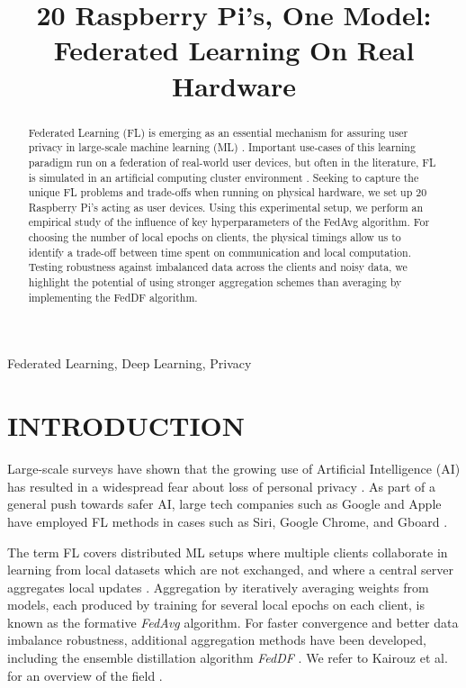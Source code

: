 \documentclass{article}
\title{20 Raspberry Pi's, One Model: Federated Learning On Real Hardware}
\begin{document}
%

\maketitle
%
\begin{abstract}
    Federated Learning (FL) is emerging as an essential mechanism for assuring user privacy in large-scale machine learning (ML) \cite{kai2021advances}.
    Important use-cases of this learning paradigm run on a federation of real-world user devices, but often in the literature, FL is simulated in an artificial computing cluster environment \cite{kai2021advances,mcmahan2017communication,lin2020ensemble}.
    Seeking to capture the unique FL problems and trade-offs when running on physical hardware, we set up 20 Raspberry Pi's acting as user devices.
    Using this experimental setup, we perform an empirical study of the influence of key hyperparameters of the FedAvg \cite{mcmahan2017communication} algorithm.
    For choosing the number of local epochs on clients, the physical timings allow us to identify a trade-off between time spent on communication and local computation.
    Testing robustness against imbalanced data across the clients and noisy data, we highlight the potential of using stronger aggregation schemes than averaging by implementing the FedDF \cite{lin2020ensemble} algorithm.
\end{abstract}
%
\begin{keywords}
    Federated Learning, Deep Learning, Privacy
\end{keywords}


\section{INTRODUCTION}
\label{sec:intro}
Large-scale surveys have shown that the growing use of Artificial Intelligence (AI) has resulted in a widespread fear about loss of personal privacy \cite{beuc2020consumers, west2018survey}.
As part of a general push towards safer AI, large tech companies such as Google and Apple have employed FL methods in cases such as Siri, Google Chrome, and Gboard \cite{kai2021advances}.

The term FL covers distributed ML setups where multiple clients collaborate in learning from local datasets which are not exchanged, and where a central server aggregates local updates \cite{kai2021advances, mcmahan2017communication}.
Aggregation by iteratively averaging weights from models, each produced by training for several local epochs on each client, is known as the formative \emph{FedAvg} \cite{mcmahan2017communication} algorithm.
For faster convergence and better data imbalance robustness, additional aggregation methods have been developed, including the ensemble distillation algorithm \emph{FedDF} \cite{lin2020ensemble}. We refer to Kairouz et al. for an overview of the field \cite{kai2021advances}.
\end{document}
